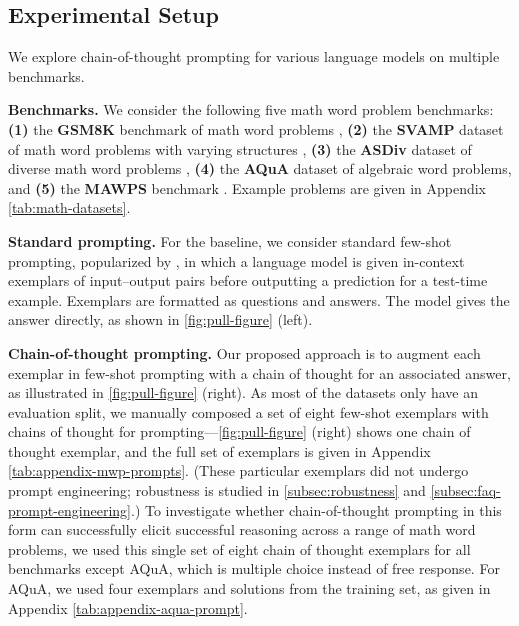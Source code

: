 \subsection{Experimental Setup}

We explore chain-of-thought prompting for various language models on multiple benchmarks.

\textbf{Benchmarks.}
We consider the following five math word problem benchmarks:
\textbf{(1)} the \textbf{GSM8K} benchmark of math word problems \citep{cobbe2021training}, 
\textbf{(2)} the \textbf{SVAMP} dataset of math word problems with varying structures \citep{patel-etal-2021-nlp},
\textbf{(3)} the \textbf{ASDiv} dataset of diverse math word problems \citep{miao-etal-2020-diverse},
\textbf{(4)} the \textbf{AQuA} dataset of algebraic word problems, and
\textbf{(5)} the \textbf{MAWPS} benchmark \citep{koncel-kedziorski-etal-2016-mawps}. Example problems are given in Appendix \ref{tab:math-datasets}.

\textbf{Standard prompting.} For the baseline, we consider standard few-shot prompting, popularized by \citet{brown2020language}, in which a language model is given in-context exemplars of input--output pairs before outputting a prediction for a test-time example. Exemplars are formatted as questions and answers. The model gives the answer directly, as shown in \ref{fig:pull-figure} (left).

\textbf{Chain-of-thought prompting.} Our proposed approach is to augment each exemplar in few-shot prompting with a chain of thought for an associated answer, as illustrated in \ref{fig:pull-figure} (right). As most of the datasets only have an evaluation split, we manually composed a set of eight few-shot exemplars with chains of thought for prompting---\ref{fig:pull-figure} (right) shows one chain of thought exemplar, and the full set of exemplars is given in Appendix \ref{tab:appendix-mwp-prompts}. 
(These particular exemplars did not undergo prompt engineering; robustness is studied in \ref{subsec:robustness} and \ref{subsec:faq-prompt-engineering}.)
To investigate whether chain-of-thought prompting in this form can successfully elicit successful reasoning across a range of math word problems, we used this single set of eight chain of thought exemplars for all benchmarks except AQuA, which is multiple choice instead of free response. For AQuA, we used four exemplars and solutions from the training set, as given in Appendix \ref{tab:appendix-aqua-prompt}.

